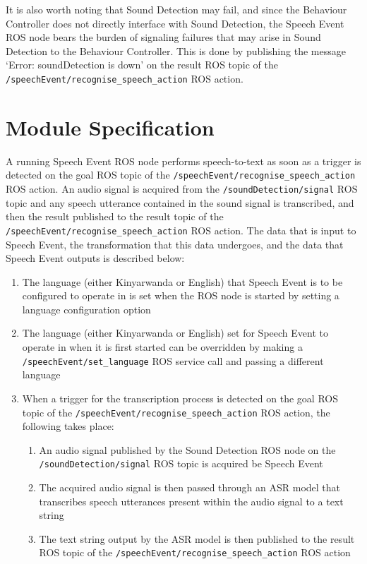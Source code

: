\documentclass{CSSRforAfrica}
\begin{document}
It is also worth noting that Sound Detection may fail, and since the Behaviour Controller does not directly interface with Sound Detection, the Speech Event ROS node bears the burden of signaling failures that may arise in Sound Detection to the Behaviour Controller. This is done by publishing the message `Error: soundDetection is down' on the result ROS topic of the \\\texttt{/speechEvent/recognise\_speech\_action} ROS action.


\newpage
\section{Module Specification}
A running Speech Event ROS node performs speech-to-text as soon as a trigger is detected on the goal ROS topic of the \texttt{/speechEvent/recognise\_speech\_action} ROS action. An audio signal is acquired from the \texttt{/soundDetection/signal} ROS topic and any speech utterance contained in the sound signal is transcribed, and then the result published to the result topic of the \texttt{/speechEvent/recognise\_speech\_action} ROS action. The data that is input to Speech Event, the transformation that this data undergoes, and the data that Speech Event outputs is described below:

\begin{enumerate}
    \item The language (either Kinyarwanda or English) that Speech Event is to be configured to operate in is set when the ROS node is started by setting a language configuration option
    \item The language (either Kinyarwanda or English) set for Speech Event to operate in when it is first started can be overridden by making a \texttt{/speechEvent/set\_language} ROS service call and passing a different language
    \item When a trigger for the transcription process is detected on the goal ROS topic of the \texttt{/speechEvent/recognise\_speech\_action} ROS action, the following takes place:
    \begin{enumerate}
        \item An audio signal published by the Sound Detection ROS node on the \texttt{/soundDetection/signal} ROS topic is acquired be Speech Event
        \item The acquired audio signal is then passed through an ASR model that transcribes speech utterances present within the audio signal to a text string
        \item The text string output by the ASR model is then published to the result ROS topic of the \texttt{/speechEvent/recognise\_speech\_action} ROS action
    \end{enumerate}
\end{enumerate}
\end{document}
